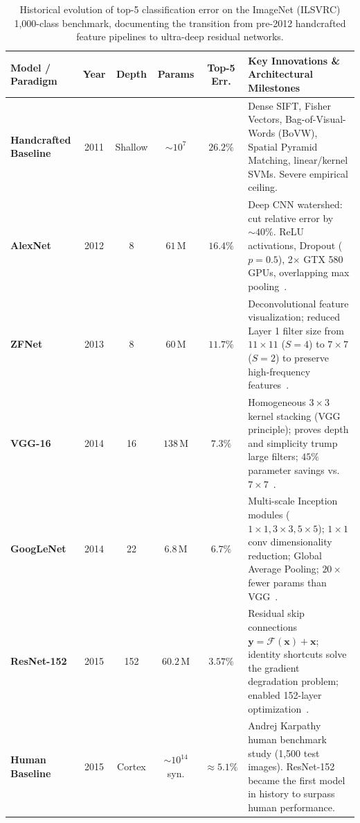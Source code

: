 \begin{table}[H]
\centering
\footnotesize
\setlength{\tabcolsep}{4pt}
\caption{Historical evolution of top-5 classification error on the ImageNet (ILSVRC) 1,000-class benchmark, documenting the transition from pre-2012 handcrafted feature pipelines to ultra-deep residual networks.}
\label{tab:imagenet_historical_evolution}
\vspace{4pt}
\begin{tabularx}{\textwidth}{>{\raggedright\arraybackslash}p{2.6cm} c c c c >{\raggedright\arraybackslash}X}
\toprule
\textbf{Model / Paradigm} & \textbf{Year} & \textbf{Depth} & \textbf{Params} & \textbf{Top-5 Err.} & \textbf{Key Innovations \& Architectural Milestones} \\
\midrule
\textbf{Handcrafted Baseline} & 2011 & Shallow & $\sim 10^7$ & $26.2\%$ & Dense SIFT, Fisher Vectors, Bag-of-Visual-Words (BoVW), Spatial Pyramid Matching, linear/kernel SVMs. Severe empirical ceiling. \\
\addlinespace
\textbf{AlexNet} & 2012 & 8 & $61\,\text{M}$ & $16.4\%$ & Deep CNN watershed: cut relative error by $\sim 40\%$. ReLU activations, Dropout ($p=0.5$), 2$\times$ GTX 580 GPUs, overlapping max pooling~\cite{krizhevsky2012imagenet}. \\
\addlinespace
\textbf{ZFNet} & 2013 & 8 & $60\,\text{M}$ & $11.7\%$ & Deconvolutional feature visualization; reduced Layer 1 filter size from $11\times 11$ ($S=4$) to $7\times 7$ ($S=2$) to preserve high-frequency features~\cite{zeiler2014visualizing}. \\
\addlinespace
\textbf{VGG-16} & 2014 & 16 & $138\,\text{M}$ & $7.3\%$ & Homogeneous $3\times 3$ kernel stacking (VGG principle); proves depth and simplicity trump large filters; $45\%$ parameter savings vs. $7\times 7$~\cite{simonyan2014very}. \\
\addlinespace
\textbf{GoogLeNet} & 2014 & 22 & $6.8\,\text{M}$ & $6.7\%$ & Multi-scale Inception modules ($1\times 1, 3\times 3, 5\times 5$); $1\times 1$ conv dimensionality reduction; Global Average Pooling; $20\times$ fewer params than VGG~\cite{szegedy2015going}. \\
\addlinespace
\textbf{ResNet-152} & 2015 & 152 & $60.2\,\text{M}$ & $\mathbf{3.57\%}$ & Residual skip connections $\mathbf{y} = \mathcal{F}(\mathbf{x}) + \mathbf{x}$; identity shortcuts solve the gradient degradation problem; enabled 152-layer optimization~\cite{he2016deep}. \\
\midrule
\textbf{Human Baseline} & 2015 & Cortex & $\sim 10^{14}$ syn. & $\approx \mathbf{5.1\%}$ & Andrej Karpathy human benchmark study (1,500 test images). ResNet-152 became the first model in history to surpass human performance. \\
\bottomrule
\end{tabularx}
\end{table}

